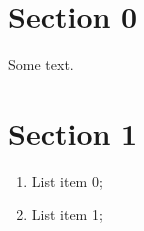 \section{Section 0}
\par Some text.

\section{Section 1}

\begin{enumerate}[label=\roman*]
	\item List item 0;
	\item List item 1;
\end{enumerate}

\clearpage